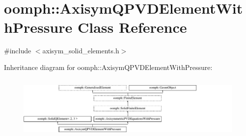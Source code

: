\hypertarget{classoomph_1_1AxisymQPVDElementWithPressure}{}\section{oomph\+:\+:Axisym\+Q\+P\+V\+D\+Element\+With\+Pressure Class Reference}
\label{classoomph_1_1AxisymQPVDElementWithPressure}


{\ttfamily \#include $<$axisym\+\_\+solid\+\_\+elements.\+h$>$}

Inheritance diagram for oomph\+:\+:Axisym\+Q\+P\+V\+D\+Element\+With\+Pressure\+:\begin{figure}[H]
\begin{center}
\leavevmode
\includegraphics[height=3.196347cm]{classoomph_1_1AxisymQPVDElementWithPressure}
\end{center}
\end{figure}
